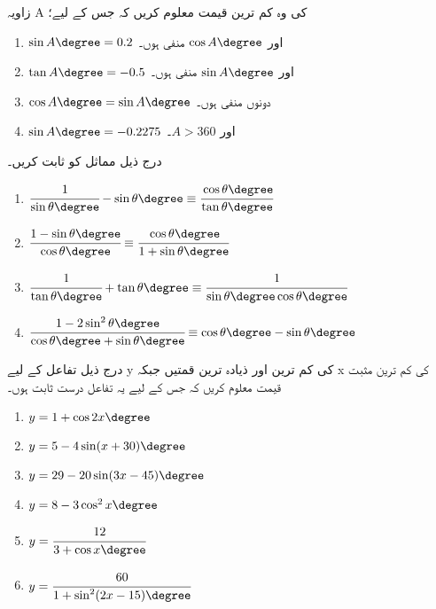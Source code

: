 زاویہ A کی وہ کم ترین قیمت معلوم کریں کہ جس کے لیے؛
\begin{enumerate}
\item
\(\sin A\degree=0.2\)
اور \(\cos A\degree\) منفی ہوں۔
\item
 \(\tan A\degree=-0.5 \)
اور \(\sin A\degree \) منفی ہوں۔
\item
\(\cos A\degree=\sin A\degree \)
دونوں منفی ہوں۔
\item
\(\sin A\degree=-0.2275 \)
اور \(A>360 \)۔
\end{enumerate}
درج ذیل مماثل کو ثابت کریں۔
\begin{enumerate}
\item   \(\cfrac{1}{\sin\theta\degree}-\sin\theta\degree\equiv\cfrac{\cos\theta\degree}{\tan\theta\degree} \)
\item  \(\cfrac{1-\sin\theta\degree}{\cos\theta\degree}\equiv\cfrac{\cos\theta\degree}{1+\sin\theta\degree}\)
\item    \(\cfrac{1}{\tan\theta\degree}+\tan\theta\degree\equiv\cfrac{1}{\sin\theta\degree\cos\theta\degree} \)
\item     \(\cfrac{1-2\sin^2\theta\degree}{\cos\theta\degree+\sin\theta\degree}\equiv \cos\theta\degree-\sin\theta\degree \)
\end{enumerate}
درج ذیل تفاعل کے لیے y کی کم ترین اور ذیادہ ترین قمتیں جبکہ x کی کم ترین مثبت قیمت معلوم کریں کہ جس کے لیے یہ تفاعل درست ثابت ہوں۔
\begin{enumerate}
\item  \(y=1+\cos2x\degree \)
\item   \(y=5-4\sin(x+30)\degree \)
\item     \(y=29-20\sin(3x-45)\degree \)
\item  \(y=8-3\cos^2x\degree \)
\item   \(y=\cfrac{12}{3+\cos x\degree} \)
\item  \(y=\cfrac{60}{1+\sin^2(2x-15)\degree} \)
\end{enumerate}


